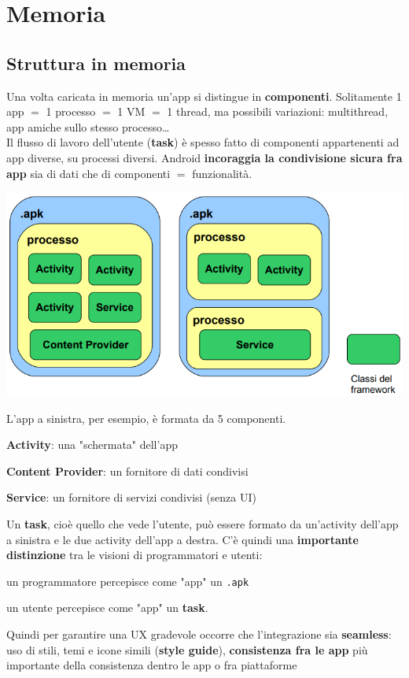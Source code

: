 \documentclass[10pt]{book}
\begin{document}
\section{Memoria}
\subsection{Struttura in memoria}
Una volta caricata in memoria un'app si distingue in \textbf{componenti}. Solitamente 1 app $=$ 1 processo $=$ 1 VM $=$ 1 thread, ma possibili variazioni: multithread, app amiche sullo stesso processo\ldots\\
Il flusso di lavoro dell'utente (\textbf{task}) è spesso fatto di componenti appartenenti ad app diverse, su processi diversi. Android \textbf{incoraggia la condivisione sicura fra app} sia di dati che di componenti $=$ funzionalità.
\begin{center}
	\includegraphics[scale=0.7]{strutturamem.png}
\end{center}
L'app a sinistra, per esempio, è formata da 5 componenti.
\begin{list}{}{I componenti che vedremo durante il corso possono essere dei seguenti \textbf{tipi}:}
	\item \textbf{Activity}: una "schermata" dell'app
	\item \textbf{Content Provider}: un fornitore di dati condivisi
	\item \textbf{Service}: un fornitore di servizi condivisi (senza UI)
\end{list}
Un \textbf{task}, cioè quello che vede l'utente, può essere formato da un'activity dell'app a sinistra e le due activity dell'app a destra. C'è quindi una \textbf{importante distinzione} tra le visioni di programmatori e utenti:
\begin{list}{}{}
	\item un programmatore percepisce come "app" un \texttt{.apk}
	\item un utente percepisce come "app" un \textbf{task}.
\end{list}
Quindi per garantire una UX gradevole occorre che l'integrazione sia \textbf{seamless}: uso di stili, temi e icone simili (\textbf{style guide}), \textbf{consistenza fra le app} più importante della consistenza dentro le app o fra piattaforme
\end{document}
